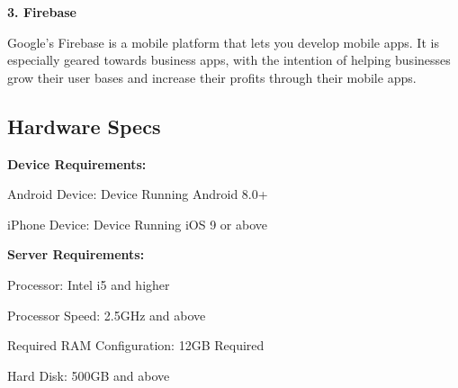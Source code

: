 \documentclass[../Report.tex]{subfiles}
\begin{document}
\textbf{3. Firebase}

Google’s Firebase is a mobile platform that lets you develop mobile apps. 
It is especially geared towards business apps, with the intention of helping businesses grow their user bases and increase their profits through their mobile apps.\par


\subsection{Hardware Specs}

\textbf{Device Requirements:}

Android Device: Device Running Android 8.0+

iPhone Device: Device Running iOS 9 or above


\textbf{Server Requirements:}

Processor: Intel i5 and higher

Processor Speed: 2.5GHz and above

Required RAM Configuration: 12GB Required

Hard Disk: 500GB and above
\end{document}

